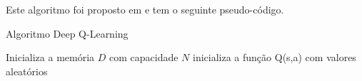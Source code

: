 \documentclass[12pt,a4paper]{article}
\begin{document}
Este algoritmo foi proposto em \cite{mni2013} e tem o seguinte pseudo-código. 

\begin{algorithm}
\caption{Algoritmo Deep Q-Learning}\label{deepqlearning}
\begin{algorithmic} 
\State Inicializa a memória $D$ com capacidade $N$
\State inicializa a função Q(s,a) com valores aleatórios
\end{algorithmic}
\end{algorithm}


	
	

	
\end{document}
